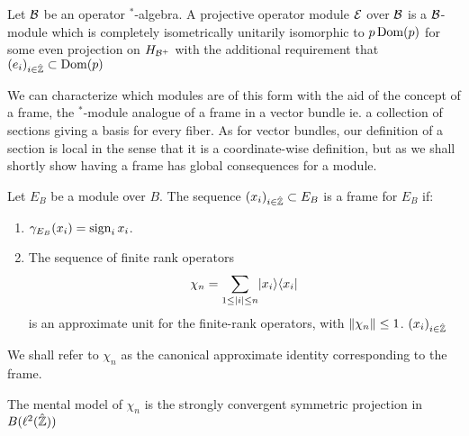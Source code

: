 \begin{definition}
	Let $\mathcal{B}$ be an operator $^*$-algebra. A projective operator module $\mathcal{E}$ over $\mathcal{B}$ is a $\mathcal{B}$-module which is completely isometrically unitarily isomorphic to $p\operatorname{Dom}(p)$ for some even projection on $H_{\mathcal{B}^+}$ with the additional requirement that $(e_i)_{i\in \hat{\mathbb{Z}}}\subset \operatorname{Dom}(p)$ 
\end{definition}
We can characterize which modules are of this form with the aid of the concept of a frame, the $^*$-module analogue of a frame in a vector bundle ie. a collection of sections giving a basis for every fiber. 
As for vector bundles, our definition of a section is local in the sense that it is a coordinate-wise definition, but as we shall shortly show having a frame has global consequences for a module.
\begin{definition}
	Let $E_B$ be a \Cstar module over $B$. The sequence $(x_i)_{i\in \hat{\mathbb{Z}}}\subset E_B$ is a frame for $E_B$ if:
	\begin{enumerate}
	
	\item  $\gamma_{E_B}(x_i)=\operatorname{sign}_i x_i$. 
	\item 
	The sequence of finite rank operators 
	\begin{align*}
		\chi_n=\sum_{1\leq |i|\leq n} \lvert x_i \rangle\langle x_i \rvert
	\end{align*}
	is an approximate unit for the finite-rank operators, with $\left \Vert \chi_n \right \Vert\leq 1$. $(x_i)_{i\in \hat{\mathbb{Z}}}$  
	\end{enumerate}
	We shall refer to $\chi_n$ as the canonical approximate identity corresponding to the frame. 
\end{definition}
The mental model of $\chi_n$ is the strongly convergent symmetric projection in $B(\ell^2(\hat{\mathbb{Z}}))$ 

